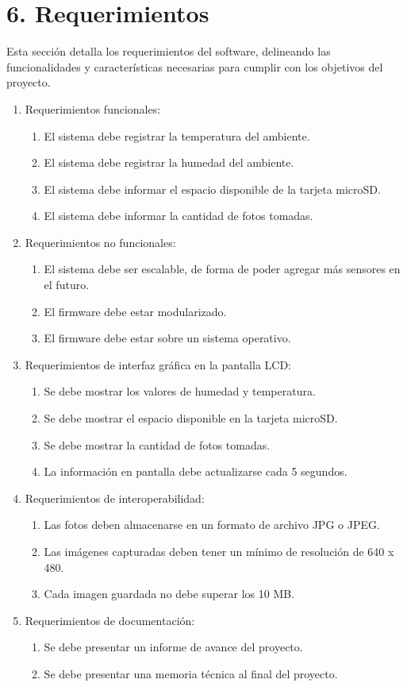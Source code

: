 \documentclass[
11pt, %
]{charter}
\begin{document}
\section{6. Requerimientos}
\label{sec:requerimientos}
Esta sección detalla los requerimientos del software, delineando las funcionalidades y características necesarias para cumplir con los objetivos del proyecto.

\begin{enumerate}
	\item Requerimientos funcionales:
		\begin{enumerate}
			\item El sistema debe registrar la temperatura del ambiente.
			\item El sistema debe registrar la humedad del ambiente.
			\item El sistema debe informar el espacio disponible de la tarjeta microSD.
            \item El sistema debe informar la cantidad de fotos tomadas.
		\end{enumerate}
	\item Requerimientos no funcionales:
		\begin{enumerate}
			\item El sistema debe ser escalable, de forma de poder agregar más sensores en el futuro.
			\item El firmware debe estar modularizado.
            \item El firmware debe estar sobre un sistema operativo.
		\end{enumerate}
    \item Requerimientos de interfaz gráfica en la pantalla LCD:
		\begin{enumerate}
			\item Se debe mostrar los valores de humedad y temperatura.
			\item Se debe mostrar el espacio disponible en la tarjeta microSD.
            \item Se debe mostrar la cantidad de fotos tomadas.
            \item La información en pantalla debe actualizarse cada 5 segundos.
		\end{enumerate}
    \item Requerimientos de interoperabilidad:
		\begin{enumerate}
			\item Las fotos deben almacenarse en un formato de archivo JPG o JPEG.
			\item Las imágenes capturadas deben tener un mínimo de resolución de 640 x 480.
            \item Cada imagen guardada no debe superar los 10 MB.
		\end{enumerate}
    \item Requerimientos de documentación:
		\begin{enumerate}
			\item Se debe presentar un informe de avance del proyecto.
			\item Se debe presentar una memoria técnica al final del proyecto.
		\end{enumerate}
\end{enumerate}
\end{document}
